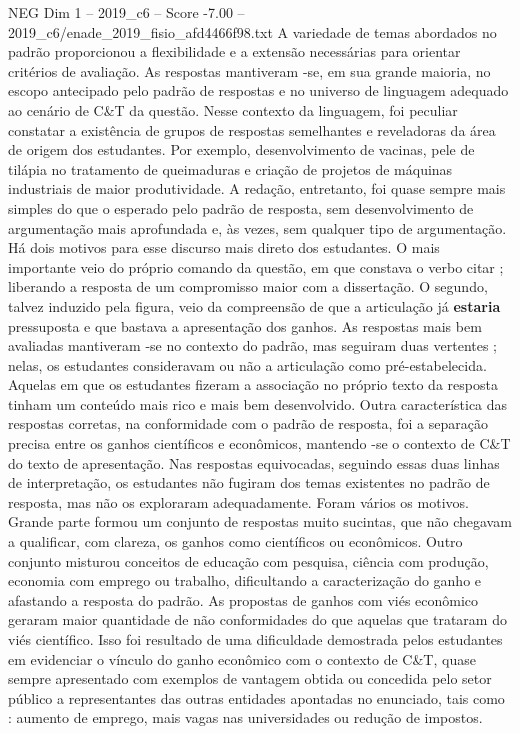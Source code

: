 \begin{textsample}{NEG Dim 1 – 2019\_c6 – Score -7.00 – 2019\_c6/enade\_2019\_fisio\_afd4466f98.txt}
A variedade de temas abordados no padrão proporcionou a flexibilidade e a extensão necessárias para orientar critérios de avaliação.
As respostas mantiveram -se, em sua grande maioria, no escopo antecipado pelo padrão de respostas e no universo de linguagem adequado ao cenário de C\&T da questão.
Nesse contexto da linguagem, foi peculiar constatar a existência de grupos de respostas semelhantes e reveladoras da área de origem dos estudantes.
Por exemplo, desenvolvimento de vacinas, pele de tilápia no tratamento de queimaduras e criação de projetos de máquinas industriais de maior produtividade.
A redação, entretanto, foi quase sempre mais simples do que o esperado pelo padrão de resposta, sem desenvolvimento de argumentação mais aprofundada e, às vezes, sem qualquer tipo de argumentação.
Há dois motivos para esse discurso mais direto dos estudantes.
O mais importante veio do próprio comando da questão, em que constava o verbo citar ; liberando a resposta de um compromisso maior com a dissertação.
O segundo, talvez induzido pela figura, veio da compreensão de que a articulação já \textbf{estaria} pressuposta e que bastava a apresentação dos ganhos.
As respostas mais bem avaliadas mantiveram -se no contexto do padrão, mas seguiram duas vertentes ; nelas, os estudantes consideravam ou não a articulação como pré-estabelecida.
Aquelas em que os estudantes fizeram a associação no próprio texto da resposta tinham um conteúdo mais rico e mais bem desenvolvido.
Outra característica das respostas corretas, na conformidade com o padrão de resposta, foi a separação precisa entre os ganhos científicos e econômicos, mantendo -se o contexto de C\&T do texto de apresentação.
Nas respostas equivocadas, seguindo essas duas linhas de interpretação, os estudantes não fugiram dos temas existentes no padrão de resposta, mas não os exploraram adequadamente.
Foram vários os motivos.
Grande parte formou um conjunto de respostas muito sucintas, que não chegavam a qualificar, com clareza, os ganhos como científicos ou econômicos.
Outro conjunto misturou conceitos de educação com pesquisa, ciência com produção, economia com emprego ou trabalho, dificultando a caracterização do ganho e afastando a resposta do padrão.
As propostas de ganhos com viés econômico geraram maior quantidade de não conformidades do que aquelas que trataram do viés científico.
Isso foi resultado de uma dificuldade demostrada pelos estudantes em evidenciar o vínculo do ganho econômico com o contexto de C\&T, quase sempre apresentado com exemplos de vantagem obtida ou concedida pelo setor público a representantes das outras entidades apontadas no enunciado, tais como : aumento de emprego, mais vagas nas universidades ou redução de impostos.

\end{textsample}

